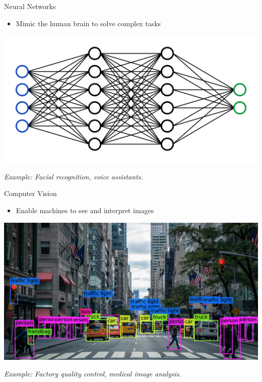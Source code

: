 \documentclass[serif, aspectratio=169]{beamer}
\begin{document}
\begin{frame}{Neural Networks}
    \begin{itemize}
        \item Mimic the human brain to solve complex tasks
    \end{itemize}
    \vspace{0.5cm}
    \begin{center}
        \includegraphics[width=0.7\linewidth]{pic/be3.png}
    \end{center}
    \begin{center}
        \textit{Example: Facial recognition, voice assistants.}
    \end{center}
\end{frame}

\begin{frame}{Computer Vision}
    \begin{itemize}
        \item Enable machines to see and interpret images
    \end{itemize}
    \vspace{0.5cm}
    \begin{center}
    \includegraphics[width=0.7\linewidth]{pic/be4.png} 
    \end{center}
    \begin{center}
        \textit{Example: Factory quality control, medical image analysis.}
    \end{center}
\end{frame}
\end{document}
